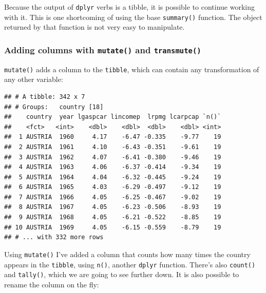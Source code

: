 \documentclass[]{gitbook}
\newenvironment{Shaded}{\begin{snugshade}}{\end{snugshade}}
\newcommand{\KeywordTok}[1]{\textcolor[rgb]{0.13,0.29,0.53}{\textbf{#1}}}
\newcommand{\NormalTok}[1]{#1}
\newcommand{\OperatorTok}[1]{\textcolor[rgb]{0.81,0.36,0.00}{\textbf{#1}}}
\newcommand{\StringTok}[1]{\textcolor[rgb]{0.31,0.60,0.02}{#1}}
\begin{document}
Because the output of \texttt{dplyr} verbs is a tibble, it is possible to continue working with it. This
is one shortcoming of using the base \texttt{summary()} function. The object returned by that function
is not very easy to manipulate.

\hypertarget{adding-columns-with-mutate-and-transmute}{%
\subsubsection{\texorpdfstring{Adding columns with \texttt{mutate()} and \texttt{transmute()}}{Adding columns with mutate() and transmute()}}\label{adding-columns-with-mutate-and-transmute}}

\texttt{mutate()} adds a column to the \texttt{tibble}, which can contain any transformation of any other
variable:

\begin{Shaded}
\end{Shaded}

\begin{verbatim}
## # A tibble: 342 x 7
## # Groups:   country [18]
##    country  year lgaspcar lincomep  lrpmg lcarpcap `n()`
##    <fct>   <int>    <dbl>    <dbl>  <dbl>    <dbl> <int>
##  1 AUSTRIA  1960     4.17    -6.47 -0.335    -9.77    19
##  2 AUSTRIA  1961     4.10    -6.43 -0.351    -9.61    19
##  3 AUSTRIA  1962     4.07    -6.41 -0.380    -9.46    19
##  4 AUSTRIA  1963     4.06    -6.37 -0.414    -9.34    19
##  5 AUSTRIA  1964     4.04    -6.32 -0.445    -9.24    19
##  6 AUSTRIA  1965     4.03    -6.29 -0.497    -9.12    19
##  7 AUSTRIA  1966     4.05    -6.25 -0.467    -9.02    19
##  8 AUSTRIA  1967     4.05    -6.23 -0.506    -8.93    19
##  9 AUSTRIA  1968     4.05    -6.21 -0.522    -8.85    19
## 10 AUSTRIA  1969     4.05    -6.15 -0.559    -8.79    19
## # ... with 332 more rows
\end{verbatim}

Using \texttt{mutate()} I've added a column that counts how many times the country appears in the \texttt{tibble},
using \texttt{n()}, another \texttt{dplyr} function. There's also \texttt{count()} and \texttt{tally()}, which we are going to
see further down. It is also possible to rename the column on the fly:
\end{document}
